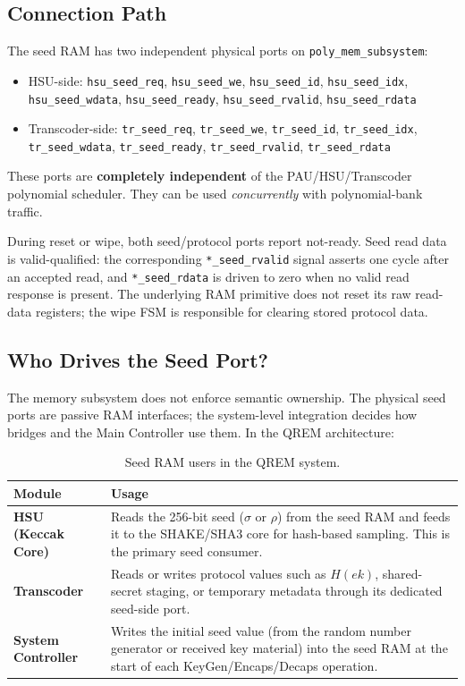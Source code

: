 \documentclass[11pt,letterpaper]{article}
\begin{document}
\subsection{Connection Path}

The seed RAM has two independent physical ports on
\texttt{poly\_mem\_subsystem}:

\begin{itemize}
  \item HSU-side: \texttt{hsu\_seed\_req}, \texttt{hsu\_seed\_we},
    \texttt{hsu\_seed\_id}, \texttt{hsu\_seed\_idx},
    \texttt{hsu\_seed\_wdata},
    \texttt{hsu\_seed\_ready}, \texttt{hsu\_seed\_rvalid},
    \texttt{hsu\_seed\_rdata}
  \item Transcoder-side: \texttt{tr\_seed\_req}, \texttt{tr\_seed\_we},
    \texttt{tr\_seed\_id}, \texttt{tr\_seed\_idx},
    \texttt{tr\_seed\_wdata},
    \texttt{tr\_seed\_ready}, \texttt{tr\_seed\_rvalid},
    \texttt{tr\_seed\_rdata}
\end{itemize}

These ports are \textbf{completely independent} of the PAU/HSU/Transcoder
polynomial scheduler. They can be used \emph{concurrently} with polynomial-bank
traffic.

During reset or wipe, both seed/protocol ports report not-ready. Seed read data
is valid-qualified: the corresponding \texttt{*\_seed\_rvalid} signal asserts
one cycle after an accepted read, and \texttt{*\_seed\_rdata} is driven to zero
when no valid read response is present. The underlying RAM primitive does not
reset its raw read-data registers; the wipe FSM is responsible for clearing
stored protocol data.

\subsection{Who Drives the Seed Port?}

The memory subsystem does not enforce semantic ownership. The physical seed
ports are passive RAM interfaces; the system-level integration decides how
bridges and the Main Controller use them. In the QREM architecture:

\begin{table}[H]
\centering
\caption{Seed RAM users in the QREM system.}
\label{tab:seed_users}
\begin{tabular}{@{}lp{8cm}@{}}
\toprule
\textbf{Module} & \textbf{Usage} \\
\midrule
\textbf{HSU (Keccak Core)} &
  Reads the 256-bit seed ($\sigma$ or $\rho$) from the seed RAM and
  feeds it to the SHAKE/SHA3 core for hash-based sampling. This is the
  primary seed consumer. \\
\textbf{Transcoder} &
  Reads or writes protocol values such as $H(ek)$, shared-secret staging,
  or temporary metadata through its dedicated seed-side port. \\
\textbf{System Controller} &
  Writes the initial seed value (from the random number generator or
  received key material) into the seed RAM at the start of each
  KeyGen/Encaps/Decaps operation. \\
\bottomrule
\end{tabular}
\end{table}
\end{document}
